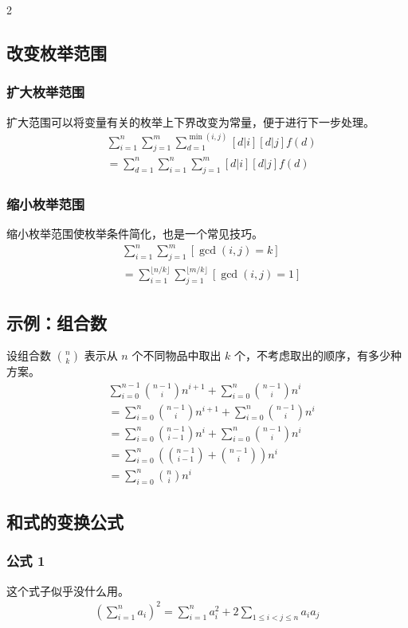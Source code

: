 \documentclass[8pt,a4paper]{article}
\begin{document}
\begin{multicols}{2}
    \subsection{改变枚举范围}
    \subsubsection{扩大枚举范围}
    扩大范围可以将变量有关的枚举上下界改变为常量，便于进行下一步处理。
    \begin{align*}
        &\sum_{i=1}^{n} \sum_{j=1}^{m} \sum_{d=1}^{\min(i,j)} [d|i][d|j]f(d) \\
        &= \sum_{d=1}^{n} \sum_{i=1}^{n} \sum_{j=1}^{m} [d|i][d|j]f(d)
    \end{align*}

    \subsubsection{缩小枚举范围}
    缩小枚举范围使枚举条件简化，也是一个常见技巧。
    \begin{align*}
        &\sum_{i=1}^{n} \sum_{j=1}^{m} [\gcd(i,j) = k] \\
        &= \sum_{i=1}^{\lfloor n/k \rfloor} \sum_{j=1}^{\lfloor m/k \rfloor} [\gcd(i,j)=1]
    \end{align*}

    \subsection{示例：组合数}
    设组合数 $\binom{n}{k}$ 表示从 $n$ 个不同物品中取出 $k$ 个，不考虑取出的顺序，有多少种方案。
    \begin{align*}
        &\sum_{i=0}^{n-1} \binom{n-1}{i} n^{i+1} + \sum_{i=0}^{n} \binom{n-1}{i} n^i \\
        &= \sum_{i=0}^{n} \binom{n-1}{i} n^{i+1} + \sum_{i=0}^{n} \binom{n-1}{i} n^i \\
        &= \sum_{i=0}^{n} \binom{n-1}{i-1} n^{i} + \sum_{i=0}^{n} \binom{n-1}{i} n^i \\
        &= \sum_{i=0}^{n} \left(\binom{n-1}{i-1} + \binom{n-1}{i}\right) n^i \\
        &= \sum_{i=0}^{n} \binom{n}{i} n^i
    \end{align*}

    \subsection{和式的变换公式}
    \subsubsection{公式 1}
    这个式子似乎没什么用。
    \begin{align*}
        \left(\sum_{i=1}^{n} a_i\right)^2 = \sum_{i=1}^{n} a_i^2 + 2 \sum_{1 \le i < j \le n} a_i a_j
    \end{align*}


\end{multicols}
\end{document}
